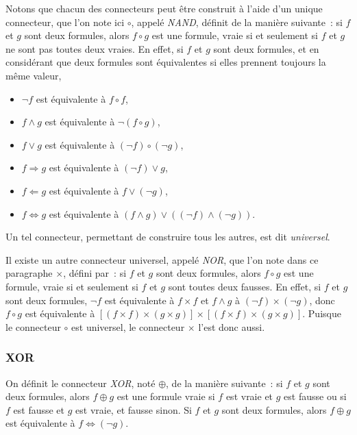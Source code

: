 Notons que chacun des connecteurs peut être construit à l'aide d'un unique connecteur, que l'on  note ici $\circ$, appelé \textit{NAND}, définit de la manière suivante : si $f$ et $g$ sont deux formules, alors $f \circ g$ est une formule, vraie si et seulement si $f$ et $g$ ne sont pas toutes deux vraies. 
En effet, si $f$ et $g$ sont deux formules, et en considérant que deux formules sont équivalentes si elles prennent toujours la même valeur,
\begin{itemize}
    \item $\neg f$ est équivalente à $f \circ f$,
    \item $f \wedge g$ est équivalente à $\neg (f \circ g)$,
    \item $f \vee g$ est équivalente à $(\neg f) \circ (\neg g)$,
    \item $f \Rightarrow g$ est équivalente à $(\neg f) \vee g$,
    \item $f \Leftarrow g$ est équivalente à $f \vee (\neg g)$,
    \item $f \Leftrightarrow g$ est équivalente à $(f \wedge g) \vee ((\neg f) \wedge (\neg g))$.
\end{itemize}
Un tel connecteur, permettant de construire tous les autres, est dit \textit{universel}.

Il existe un autre connecteur universel, appelé \textit{NOR}, que l'on note dans ce paragraphe $\times$, défini par : si $f$ et $g$ sont deux formules, alors $f \circ g$ est une formule, vraie si et seulement si $f$ et $g$ sont toutes deux fausses. 
En effet, si $f$ et $g$ sont deux formules, $\neg f$ est équivalente à $f \times f$ et $f \wedge g$ à $(\neg f) \times (\neg g)$, donc $f \circ g$ est équivalente à $[(f \times f) \times (g \times g)] \times [(f \times f) \times (g \times g)]$. 
Puisque le connecteur $\circ$ est universel, le connecteur $\times$ l'est donc aussi.

\subsubsection{XOR} 
\label{subsub:XOR}

On définit le connecteur \textit{XOR}, noté $\oplus$, de la manière suivante : si $f$ et $g$ sont deux formules, alors $f \oplus g$ est une formule vraie si $f$ est vraie et $g$ est fausse ou si $f$ est fausse et $g$ est vraie, et fausse sinon. 
Si $f$ et $g$ sont deux formules, alors $f \oplus g$ est équivalente à $f \Leftrightarrow (\neg g)$. 

